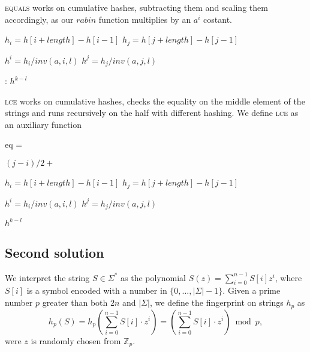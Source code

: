\textsc{equals} works on cumulative hashes, subtracting them and scaling them
accordingly, as our $rabin$ function multiplies by an $a^{i}$ costant.

\begin{algorithmic}[1]
    \State $h_i = h[i + length] - h[i - 1]$\;
    \State $h_j = h[j + length] - h[j - 1]$\;

    \State $h^{i} = h_i / inv(a, i, l)$\;
    \State $h^{j} = h_j / inv(a, j, l)$\;

    \;
    \EndFunction

    :
    \Return $h^{k - l}$
    \EndFunction
\end{algorithmic}

\textsc{lce} works on cumulative hashes, checks the equality on the middle element
of the strings and runs recursively on the half with different hashing.
We define \textsc{lce} as an auxiliary function

\begin{algorithmic}[1]
    \State eq = \;

        \Else $(j - i) / 2 + $      %
    \EndIf

    \State $h_i = h[i + length] - h[i - 1]$\;
    \State $h_j = h[j + length] - h[j - 1]$\;

    \State $h^{i} = h_i / inv(a, i, l)$\;
    \State $h^{j} = h_j / inv(a, j, l)$\;

    \;
    \EndFunction

    \Return $h^{k - l}$
    \EndFunction
\end{algorithmic}

\subsection{Second solution}

We interpret the string $S \in \Sigma^*$ as the polynomial $S(z)=\sum_{i=0}^{n-1}S[i]z^i$, where $S[i]$ is a symbol encoded with a number in $\{0, \dots, |\Sigma|-1\}$. Given a prime number $p$ greater than both $2n$ and $|\Sigma|$, we define the fingerprint on strings $h_p$ as
$$h_p(S)=h_p\left(\sum_{i=0}^{n-1}S[i] \cdot z^i\right) = \left(\sum_{i=0}^{n-1}S[i]  \cdot z^i\right) \bmod p,$$
were $z$ is randomly chosen from $\mathbb{Z}_p$.

